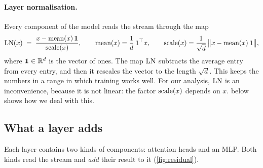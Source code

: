 \paragraph{Layer normalisation.} Every component of the model reads the stream through the map
\begin{equation}\label{eq:ln}
\mathrm{LN}(x) \;=\; \frac{x-\operatorname{mean}(x)\,\mathbf{1}}{\operatorname{scale}(x)},\qquad
\operatorname{mean}(x)=\frac1d\,\mathbf{1}^\top x,\qquad
\operatorname{scale}(x)=\frac{1}{\sqrt d}\,\big\|x-\operatorname{mean}(x)\,\mathbf{1}\big\|,
\end{equation}
where $\mathbf{1}\in\mathbb{R}^d$ is the vector of ones. The map $\mathrm{LN}$ subtracts the average entry from every entry, and then
it rescales the vector to the length $\sqrt d$. This keeps the numbers in a range in which training works well. For
our analysis, $\mathrm{LN}$ is an inconvenience, because it is not linear: the factor $\operatorname{scale}(x)$ depends on $x$.
 below shows how we deal with this.

\subsection{What a layer adds}

Each layer contains two kinds of components: attention heads and an MLP. Both kinds read the stream and
\emph{add} their result to it (\cref{fig:residual}).

